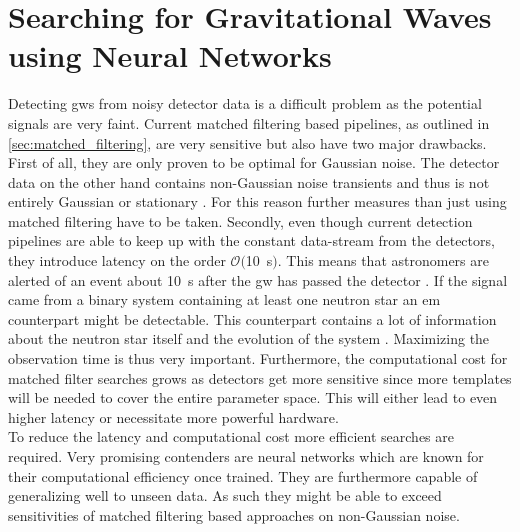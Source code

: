 \section{Searching for Gravitational Waves using Neural Networks}\label{sec:related_works}
Detecting \gls{gw}s from noisy detector data is a difficult problem as the potential signals are very faint. Current matched filtering based pipelines, as outlined in \autoref{sec:matched_filtering}, are very sensitive but also have two major drawbacks. First of all, they are only proven to be optimal for Gaussian noise. The detector data on the other hand contains non-Gaussian noise transients and thus is not entirely Gaussian or stationary \cite{glitches_gw150914}. For this reason further measures than just using matched filtering have to be taken. Secondly, even though current detection pipelines are able to keep up with the constant data-stream from the detectors, they introduce latency on the order $\mathcal{O}($\SI{10}{\s}$)$. This means that astronomers are alerted of an event about \SI{10}{\s} after the \gls{gw} has passed the detector \cite{pycbc_live}. If the signal came from a binary system containing at least one neutron star an \gls{em} counterpart might be detectable. This counterpart contains a lot of information about the neutron star itself and the evolution of the system \cite{multi_messanger}. Maximizing the observation time is thus very important. Furthermore, the computational cost for matched filter searches grows as detectors get more sensitive since more templates will be needed to cover the entire parameter space. This will either lead to even higher latency or necessitate more powerful hardware.\\
To reduce the latency and computational cost more efficient searches are required. Very promising contenders are neural networks which are known for their computational efficiency once trained. They are furthermore capable of generalizing well to unseen data. As such they might be able to exceed sensitivities of matched filtering based approaches on non-Gaussian noise.\\
